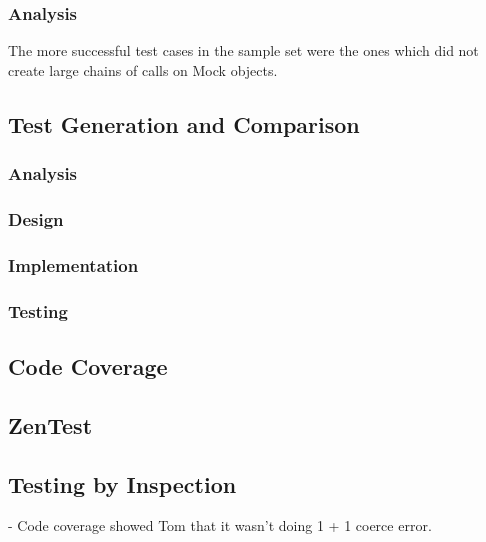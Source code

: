 \subsubsection{Analysis}
  The more successful test cases in the sample set were the ones which did not create large chains of calls on Mock objects.

  \subsection{Test Generation and Comparison}
    \subsubsection{Analysis}
    \subsubsection{Design}
    \subsubsection{Implementation}
    \subsubsection{Testing}
  \subsection{Code Coverage}
  \subsection{ZenTest}
  \subsection{Testing by Inspection}
  - Code coverage showed Tom that it wasn't doing 1 + 1 coerce error.
